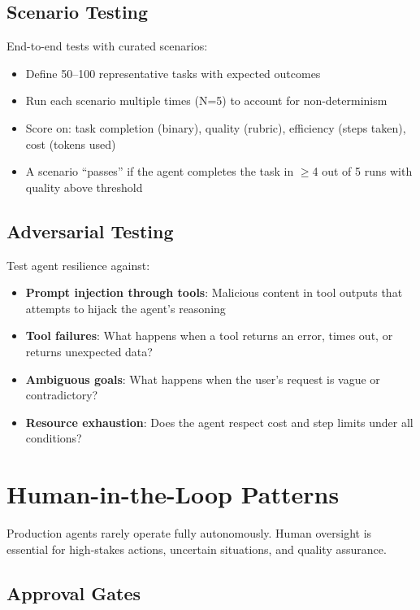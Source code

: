 \subsection{Scenario Testing}

End-to-end tests with curated scenarios:

\begin{itemize}[leftmargin=*]
    \item Define 50--100 representative tasks with expected outcomes
    \item Run each scenario multiple times (N=5) to account for non-determinism
    \item Score on: task completion (binary), quality (rubric), efficiency (steps taken), cost (tokens used)
    \item A scenario ``passes'' if the agent completes the task in $\geq$4 out of 5 runs with quality above threshold
\end{itemize}

\subsection{Adversarial Testing}

Test agent resilience against:

\begin{itemize}[leftmargin=*]
    \item \textbf{Prompt injection through tools}: Malicious content in tool outputs that attempts to hijack the agent's reasoning
    \item \textbf{Tool failures}: What happens when a tool returns an error, times out, or returns unexpected data?
    \item \textbf{Ambiguous goals}: What happens when the user's request is vague or contradictory?
    \item \textbf{Resource exhaustion}: Does the agent respect cost and step limits under all conditions?
\end{itemize}


\section{Human-in-the-Loop Patterns}

Production agents rarely operate fully autonomously. Human oversight is essential for high-stakes actions, uncertain situations, and quality assurance.

\subsection{Approval Gates}

